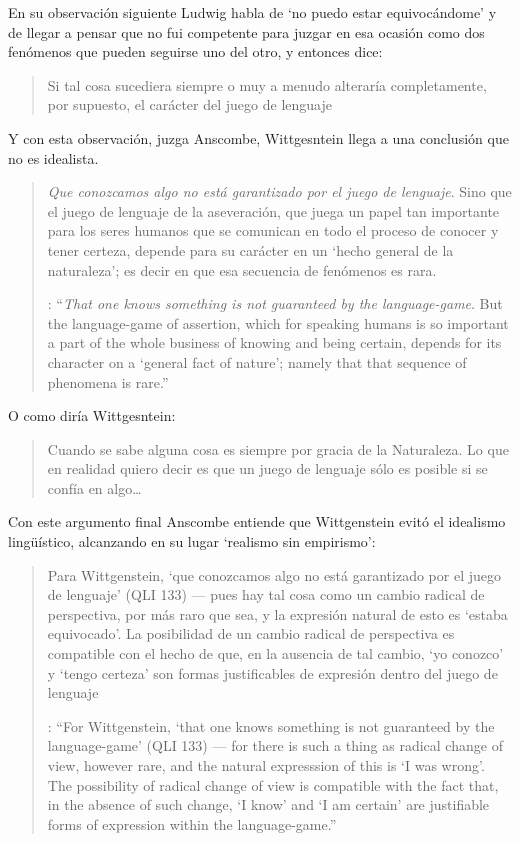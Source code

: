 En su observación siguiente Ludwig habla de \enquote*{no puedo estar equivocándome} y de llegar a pensar que no fui competente para juzgar en esa ocasión como dos fenómenos que pueden seguirse uno del otro, y entonces dice: \blockquote[{\cite[\S646]{wittgenstein1969oncertes}}
]{Si tal cosa sucediera siempre o muy a menudo alteraría completamente, por supuesto, el carácter del juego de lenguaje}. Y con esta observación, juzga Anscombe, Wittgesntein llega a una conclusión que no es idealista.  \blockquote[{\cite[133]{anscombe1981parmenides:qli}}: \enquote{\emph{That one knows something is not guaranteed by the language-game}. \textelp{} But the language-game of assertion, which for speaking humans is so important a part of the whole business of knowing and being certain, depends for its character on a `general fact of nature'; namely that that sequence of phenomena is rare.}]{\emph{Que conozcamos algo no está garantizado por el juego de lenguaje}. Sino que el juego de lenguaje de la aseveración, que juega un papel tan importante para los seres humanos que se comunican en todo el proceso de conocer y tener certeza, depende para su carácter en un `hecho general de la naturaleza'; es decir en que esa secuencia de fenómenos es rara.} O como diría Wittgesntein: \blockquote[{\cite[\S505; 509]{wittgenstein1969oncertes}}
]{Cuando se sabe alguna cosa es siempre por gracia de la Naturaleza. \textelp{} Lo que en realidad quiero decir es que un juego de lenguaje sólo es posible si se confía en algo\ldots}.

Con este argumento final Anscombe entiende que Wittgenstein evitó el idealismo lingüístico, alcanzando en su lugar `realismo sin empirismo': \blockquote[{\cite[224]{teichmann2008ans}}: \enquote{For Wittgenstein, `that one knows something is not guaranteed by the language-game' (QLI 133) --- for there is such a thing as radical change of view, however rare, and the natural expresssion of this is `I was wrong'. The possibility of radical change of view is compatible with the fact that, in the absence of such change, `I know' and `I am certain' are justifiable forms of expression within the language-game.}]{Para Wittgenstein, `que conozcamos algo no está garantizado por el juego de lenguaje' (QLI 133) --- pues hay tal cosa como un cambio radical de perspectiva, por más raro que sea, y la expresión natural de esto es `estaba equivocado'. La posibilidad de un cambio radical de perspectiva es compatible con el hecho de que, en la ausencia de tal cambio, `yo conozco' y `tengo certeza' son formas justificables de expresión dentro del juego de lenguaje}.

